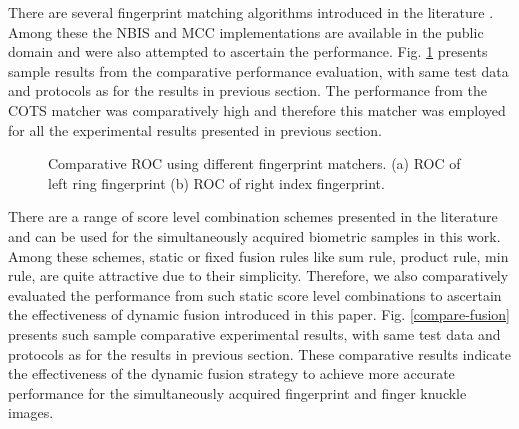 There are several fingerprint matching algorithms introduced in the literature \cite{maltoni2009handbook}. Among these the NBIS and MCC implementations are available in the public domain and were also attempted to ascertain the performance. Fig. \ref{compare-fingerprint} presents sample results from the comparative performance evaluation, with same test data and protocols as for the results in previous section. The performance from the COTS matcher was comparatively high and therefore this matcher was employed for all the experimental results presented in previous section. 
\begin{figure}[ht]
    \centering
    \caption{Comparative ROC using different fingerprint matchers. (a) ROC of left ring fingerprint (b) ROC of right index fingerprint.}
    \label{compare-fingerprint}
\end{figure}

There are a range of score level combination schemes presented in the literature and can be used for the simultaneously acquired biometric samples in this work. Among these schemes, static or fixed fusion rules like sum rule, product rule, min rule, are quite attractive due to their simplicity. Therefore, we also comparatively evaluated the performance from such static score level combinations to ascertain the effectiveness of dynamic fusion introduced in this paper. Fig. \ref{compare-fusion} presents such sample comparative experimental results, with same test data and  protocols as for the results in previous section. These comparative results indicate the effectiveness of the dynamic fusion strategy to achieve more accurate performance for the simultaneously acquired fingerprint and finger knuckle images.


